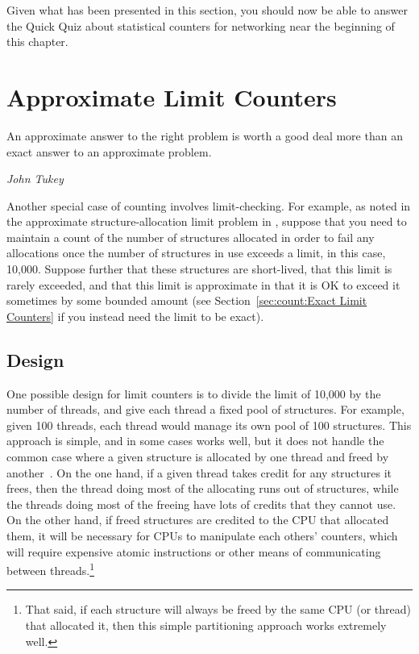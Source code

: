 Given what has been presented in this section, you should now be able
to answer the Quick Quiz about statistical counters for networking
near the beginning of this chapter.

\section{Approximate Limit Counters}
\label{sec:count:Approximate Limit Counters}
%
\epigraph{An approximate answer to the right problem is worth a good deal
	  more than an exact answer to an approximate problem.}
	 {\emph{John Tukey}}

%
Another special case of counting involves limit-checking.
For example, as noted in the approximate structure-allocation limit
problem in \QuickQuizRef{\QcountQapproxcnt},
suppose that you need to maintain a count of the number of
structures allocated in order to fail any allocations once the number
of structures in use exceeds a limit, in this case, 10,000.
Suppose further that these structures are short-lived, that this
limit is rarely exceeded, and that this limit is approximate in
that it is OK to exceed it sometimes by some bounded amount
(see Section~\ref{sec:count:Exact Limit Counters}
if you instead need the limit to be exact).

\subsection{Design}

One possible design for limit counters is to divide the limit of 10,000
by the number of threads, and give each thread a fixed pool of structures.
For example, given 100 threads, each thread would manage its own pool
of 100 structures.
This approach is simple, and in some cases works well, but it does not
handle the common case where a given structure is allocated by one
thread and freed by another~\cite{McKenney93}.
On the one hand, if a given thread takes credit for any structures it
frees, then the thread doing most of the allocating runs out
of structures, while the threads doing most of the freeing have lots
of credits that they cannot use.
On the other hand, if freed structures are credited to the CPU that
allocated them, it will be necessary for CPUs to manipulate each
others' counters, which will require expensive atomic instructions
or other means of communicating between threads.\footnote{
	That said, if each structure will always be freed
	by the same CPU (or thread) that allocated it, then
	this simple partitioning approach works extremely well.}

